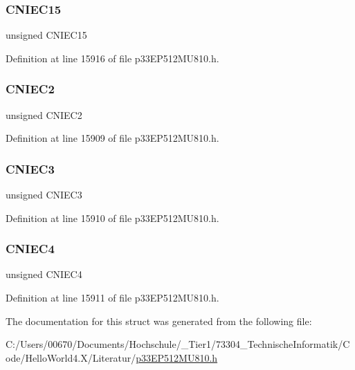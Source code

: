 \subsubsection{\texorpdfstring{C\+N\+I\+E\+C15}{CNIEC15}}
{\footnotesize\ttfamily unsigned C\+N\+I\+E\+C15}



Definition at line 15916 of file p33\+E\+P512\+M\+U810.\+h.

\mbox{\label{structtag_c_n_e_n_c_b_i_t_s_a0ce8824bc98a3c31c52f73ab1f388089}} 
\subsubsection{\texorpdfstring{C\+N\+I\+E\+C2}{CNIEC2}}
{\footnotesize\ttfamily unsigned C\+N\+I\+E\+C2}



Definition at line 15909 of file p33\+E\+P512\+M\+U810.\+h.

\mbox{\label{structtag_c_n_e_n_c_b_i_t_s_a38961348ba79919e75ad4697bb53da7b}} 
\subsubsection{\texorpdfstring{C\+N\+I\+E\+C3}{CNIEC3}}
{\footnotesize\ttfamily unsigned C\+N\+I\+E\+C3}



Definition at line 15910 of file p33\+E\+P512\+M\+U810.\+h.

\mbox{\label{structtag_c_n_e_n_c_b_i_t_s_aed4ab0487a7149fde00f52e69f42dff5}} 
\subsubsection{\texorpdfstring{C\+N\+I\+E\+C4}{CNIEC4}}
{\footnotesize\ttfamily unsigned C\+N\+I\+E\+C4}



Definition at line 15911 of file p33\+E\+P512\+M\+U810.\+h.



The documentation for this struct was generated from the following file\+:\begin{DoxyCompactItemize}
\item 
C\+:/\+Users/00670/\+Documents/\+Hochschule/\+\_\+\+Tier1/73304\+\_\+\+Technische\+Informatik/\+Code/\+Hello\+World4.\+X/\+Literatur/\hyperlink{p33_e_p512_m_u810_8h}{p33\+E\+P512\+M\+U810.\+h}\end{DoxyCompactItemize}
